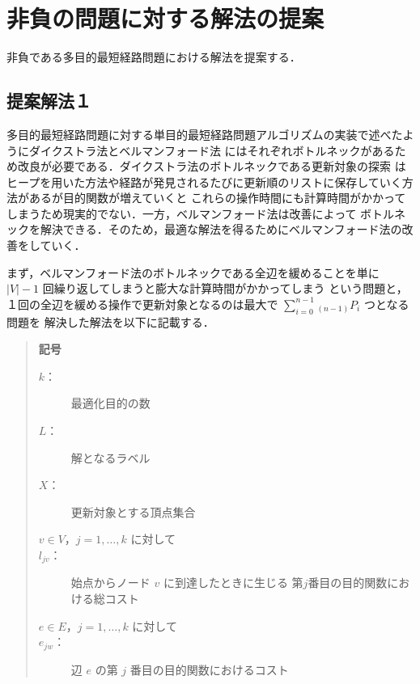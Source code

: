 \documentclass[12pt]{optlab-bachelor}
\begin{document}
\section{非負の問題に対する解法の提案}
非負である多目的最短経路問題における解法を提案する．

\subsection{提案解法１}
多目的最短経路問題に対する単目的最短経路問題アルゴリズムの実装で述べたようにダイクストラ法とベルマンフォード法
にはそれぞれボトルネックがあるため改良が必要である．ダイクストラ法のボトルネックである更新対象の探索
はヒープを用いた方法や経路が発見されるたびに更新順のリストに保存していく方法があるが目的関数が増えていくと
これらの操作時間にも計算時間がかかってしまうため現実的でない．一方，ベルマンフォード法は改善によって
ボトルネックを解決できる．そのため，最適な解法を得るためにベルマンフォード法の改善をしていく．

まず，ベルマンフォード法のボトルネックである全辺を緩めることを単に $|V|-1$ 回繰り返してしまうと膨大な計算時間がかかってしまう
という問題と，１回の全辺を緩める操作で更新対象となるのは最大で $\displaystyle \sum_{i=0}^{n-1} {}_{(n-1)}P_i$ つとなる問題を
解決した解法を以下に記載する．


\begin{quote}
  \textbf{記号}
  \begin{description}
    \item[$k$：] 最適化目的の数
    \item[$L$：] 解となるラベル
    \item[$X$：] 更新対象とする頂点集合
    \item[$v \in V$，$j = 1 , \ldots , k$ に対して]
    \item[$l_{jv}$：] 始点からノード $v$ に到達したときに生じる
    第$j$番目の目的関数における総コスト
    \item[$e \in E$，$j = 1 , \ldots , k$ に対して]
    \item[$e_{jw}$：] 辺 $e$ の第 $j$ 番目の目的関数におけるコスト
  \end{description}
\end{quote}
\end{document}
